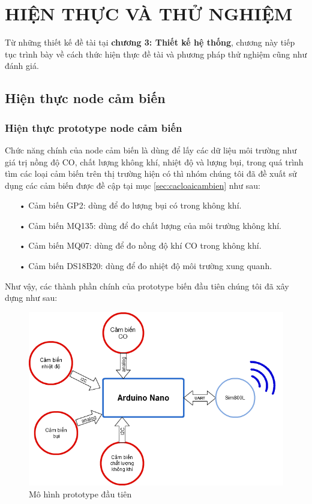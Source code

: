 \chapter{HIỆN THỰC VÀ THỬ NGHIỆM}

\ifpdf
    \graphicspath{{Chapter3/Figs/Raster/}{Chapter3/Figs/server/}{Chapter3/Figs/}}
\else
    \graphicspath{{Chapter3/Figs/Vector/}{Chapter3/Figs/}}
\fi
Từ những thiết kế đề tài tại \textbf{chương 3: Thiết kế hệ thống}, chương này tiếp tục trình bày về cách thức hiện thực đề tài và phương pháp thử nghiệm cũng như đánh giá.
\section{Hiện thực node cảm biến}
\subsection{Hiện thực prototype node cảm biến}\label{sc:prototype_dautien}
Chức năng chính của node cảm biến là dùng để lấy các dữ liệu môi trường như giá trị nồng độ CO, chất lượng không khí, nhiệt độ và lượng bụi, trong quá trình tìm các loại cảm biến trên thị trường hiện có thì nhóm chúng tôi đã đề xuất sử dụng các cảm biến được đề cập tại mục \ref{sec:cacloaicambien} như sau:
\begin{itemize}
	\item[•]Cảm biến GP2: dùng để đo lượng bụi có trong không khí.
	\item[•]Cảm  biến MQ135: dùng để đo chất lượng của môi trường không khí.
	\item[•]Cảm biến MQ07: dùng để đo nồng độ khí CO trong không khí.
	\item[•]Cảm biến DS18B20: dùng để đo nhiệt độ môi trường xung quanh. 
\end{itemize}
Như vậy, các thành phần chính của prototype biến đầu tiên chúng tôi đã xây dựng như sau:
\begin{figure}[H]
	\centering    
	\includegraphics[width=5in]{prototype_1}
	\caption[Mô hình prototype đầu tiên]{Mô hình prototype đầu tiên}
	\label{fig:prototype_1}
\end{figure}
